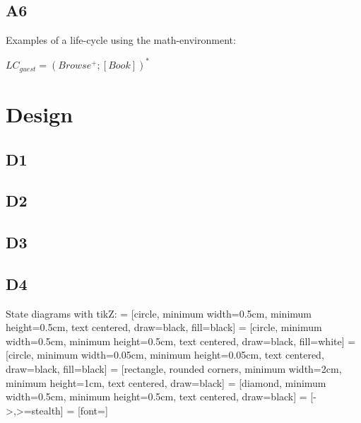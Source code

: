\documentclass[a4paper,10pt,titlepage,bibtotoc,bibtotocnumbered]{scrreprt}
\begin{document}
\newpage\section{A6}

Examples of a life-cycle using the math-environment:

$LC_{guest}=(Browse^+;[Book])^*$



\chapter{Design}

\section{D1}

\section{D2}

\section{D3}

\section{D4}

State diagrams with tikZ:
 = [circle, minimum width=0.5cm, minimum height=0.5cm, text centered, draw=black, fill=black]
 = [circle, minimum width=0.5cm, minimum height=0.5cm, text centered, draw=black, fill=white]
 = [circle, minimum width=0.05cm, minimum height=0.05cm, text centered, draw=black, fill=black]
 = [rectangle, rounded corners, minimum width=2cm, minimum height=1cm, text centered, draw=black]
 = [diamond, minimum width=0.5cm, minimum height=0.5cm, text centered, draw=black]
 = [->,>=stealth]
 = [font=\tiny]
\end{document}
